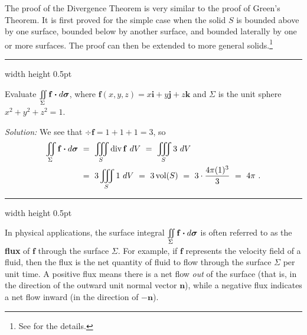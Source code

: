 
The proof of the Divergence Theorem is very similar to the proof of Green's Theorem. 
It is first proved for
the simple case when the solid $S$ is bounded above by one surface, bounded below by another surface, and bounded
laterally by one or more surfaces. 
The proof can then be extended to more general solids.\footnote{See
\cite[\S\,15.6]{tm} for the details.}

\medskip
\hrule width \textwidth height 0.5pt
\begin{exmp}
 Evaluate $\iint\limits_{\Sigma} \mathbf{f} \bm{\cdot} d\bm{\sigma}$, where $\mathbf{f}(x,y,z) = x\mathbf{i} +
  y\mathbf{j} + z\mathbf{k}$ and $\Sigma$ is the unit sphere $x^2 + y^2 + z^2 = 1$.\smallskip
\par\noindent\emph{Solution:} 
We see that $\div\mathbf{f} = 1+1+1=3$, so
 \begin{align*}
  \iint\limits_{\Sigma} \mathbf{f} \bm{\cdot} d\bm{\sigma} ~&=~
  \iiint\limits_{S} \mathop{\mathrm{div}}\nolimits\mathbf{f} ~dV
  ~=~ \iiint\limits_{S} 3 ~dV\\
  &=~ 3 \iiint\limits_{S} 1 ~dV
  ~=~ 3\,\text{vol}(S) ~=~ 3\cdot \frac{4\pi (1)^3}{3} ~=~ 4\pi ~.
 \end{align*}
\end{exmp}
\hrule width \textwidth height 0.5pt
\medskip

In physical applications, the surface integral $\iint\limits_{\Sigma} \mathbf{f} \bm{\cdot} d\bm{\sigma}$ is often
referred to as the \textbf{flux} of $\mathbf{f}$ through the surface $\Sigma$. For example, if $\mathbf{f}$
represents the velocity field of a fluid, then the flux
is the net quantity of fluid to flow through the surface $\Sigma$ per unit time. A
positive flux means there is a net flow \emph{out} of the surface (that is, in the direction of the outward
unit normal vector $\mathbf{n}$), while a negative flux indicates a net flow inward (in the direction of
$-\mathbf{n}$).

